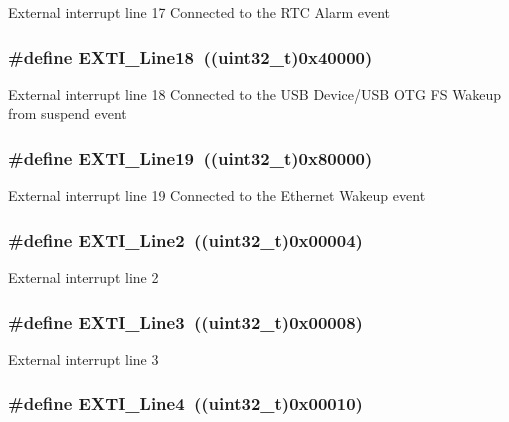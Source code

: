 \label{group__EXTI__Lines_ga3e0fc18bc0722adc09605e3093b24c6a}
External interrupt line 17 Connected to the RTC Alarm event \hypertarget{group__EXTI__Lines_ga6cdf346a3e7a3c8dbb036aca6741207c}{
\subsubsection[{EXTI\_\-Line18}]{\setlength{\rightskip}{0pt plus 5cm}\#define EXTI\_\-Line18~((uint32\_\-t)0x40000)}}
\label{group__EXTI__Lines_ga6cdf346a3e7a3c8dbb036aca6741207c}
External interrupt line 18 Connected to the USB Device/USB OTG FS Wakeup from suspend event \hypertarget{group__EXTI__Lines_ga49ac0744621f88d432d85838483ad1de}{
\subsubsection[{EXTI\_\-Line19}]{\setlength{\rightskip}{0pt plus 5cm}\#define EXTI\_\-Line19~((uint32\_\-t)0x80000)}}
\label{group__EXTI__Lines_ga49ac0744621f88d432d85838483ad1de}
External interrupt line 19 Connected to the Ethernet Wakeup event \hypertarget{group__EXTI__Lines_gaec4189bb2709c8c15a0339d1b0b9865a}{
\subsubsection[{EXTI\_\-Line2}]{\setlength{\rightskip}{0pt plus 5cm}\#define EXTI\_\-Line2~((uint32\_\-t)0x00004)}}
\label{group__EXTI__Lines_gaec4189bb2709c8c15a0339d1b0b9865a}
External interrupt line 2 \hypertarget{group__EXTI__Lines_gadea3ef6ab7e8bacc686689de8711b98c}{
\subsubsection[{EXTI\_\-Line3}]{\setlength{\rightskip}{0pt plus 5cm}\#define EXTI\_\-Line3~((uint32\_\-t)0x00008)}}
\label{group__EXTI__Lines_gadea3ef6ab7e8bacc686689de8711b98c}
External interrupt line 3 \hypertarget{group__EXTI__Lines_gab33b1fe19306e9e60f8f8d0928b800be}{
\subsubsection[{EXTI\_\-Line4}]{\setlength{\rightskip}{0pt plus 5cm}\#define EXTI\_\-Line4~((uint32\_\-t)0x00010)}}
